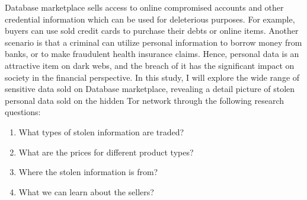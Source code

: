 Database marketplace sells access to online compromised accounts and other
credential information which can be used for deleterious purposes. For example,
buyers can use sold credit cards to purchase their debts or online items. Another
scenario is that a criminal can utilize personal information to borrow money from
banks, or to make fraudulent health insurance claims\cite{web:personal_info_darkweb}.
Hence, personal data is an attractive item on dark webs, and the breach of it has the
significant impact on society in the financial perspective. In this study, I will
explore the wide range of sensitive data sold on Database marketplace, revealing a
detail picture of stolen personal data sold on the hidden Tor network through the
following research questions:

\begin{enumerate}
    \item What types of stolen information are traded?\label{rq:type}
    \item What are the prices for different product types?\label{rq:price}
    \item Where the stolen information is from?\label{rq:where}
    \item What we can learn about the sellers?\label{rq:seller}
\end{enumerate}